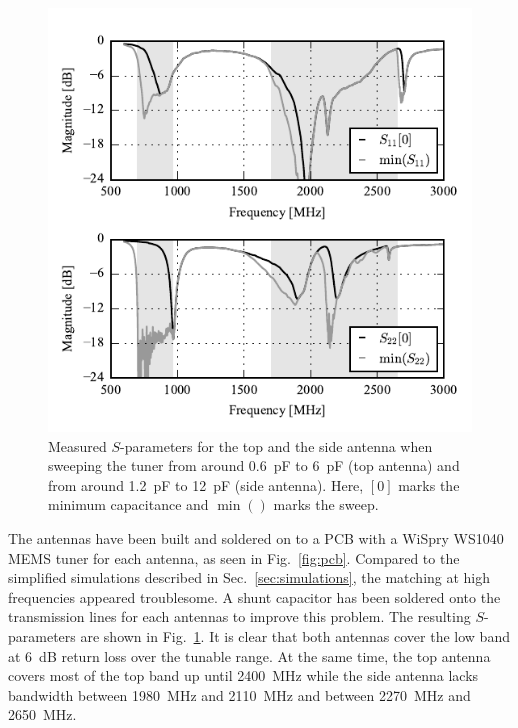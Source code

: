 \begin{figure}[tb]
    \centering
    \includegraphics{img/meas/sparams}
    \caption{Measured $S$-parameters for the top and the side antenna when sweeping the tuner from around \SI{0.6}{pF} to \SI{6}{pF} (top antenna) and from around \SI{1.2}{pF} to \SI{12}{pF} (side antenna). Here, $[0]$ marks the minimum capacitance and $\min()$ marks the sweep.}
    \label{fig:meas_sparams}
\end{figure}

The antennas have been built and soldered on to a PCB with a WiSpry WS1040 MEMS tuner for each antenna, as seen in Fig.~\ref{fig:pcb}. Compared to the simplified simulations described in Sec.~\ref{sec:simulations}, the matching at high frequencies appeared troublesome. A shunt capacitor has been soldered onto the transmission lines for each antennas to improve this problem. 
The resulting $S$-parameters are shown in Fig.~\ref{fig:meas_sparams}. It is clear that both antennas cover the low band at \SI{6}{dB} return loss over the tunable range. At the same time, the top antenna covers most of the top band up until \SI{2400}{MHz} while the side antenna lacks bandwidth between \SI{1980}{MHz} and \SI{2110}{MHz} and between \SI{2270}{MHz} and \SI{2650}{MHz}.

